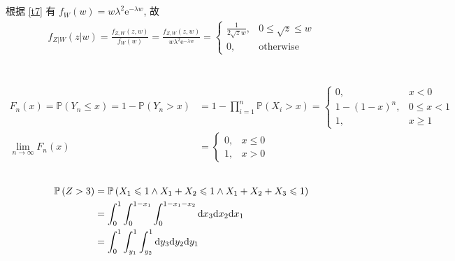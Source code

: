 \documentclass[8pt]{article}
\theoremstyle{compact}
\def\le{\leqslant}
\def\ge{\geqslant}
\def\P#1{\mathbb{P}\left({#1}\right)}
\def\e{\mathrm{e}}
\begin{document}
\subsection{}
根据 \cref{t7} 有 $f_W(w) = w\lambda^2\e^{-\lambda w}$, 故
\begin{equation}
	\begin{split}
		f_{Z | W}(z | w) = \frac{f_{Z, W}(z, w)}{f_W(w)} = \frac{f_{Z, W}(z, w)}{w\lambda^2\e^{-\lambda w}} = \begin{cases}
			\frac{1}{2\sqrt z w}, & 0 \le \sqrt z \le w\\
			0, & \text{otherwise}
		\end{cases}
	\end{split}
\end{equation}

\section{}
\subsection{}
\begin{equation}
	\begin{split}
		F_n(x) = \P{Y_n \le x} = 1 - \P{Y_n > x} &= 1 - \prod_{i=1}^{n}\P{X_i > x} = \begin{cases}
			0, & x < 0\\
			1 - (1 - x)^n, & 0 \le x < 1\\
			1, & x \ge 1
		\end{cases}\\
		\lim_{n \to \infty}F_n(x) &= \begin{cases}
			0, & x \le 0 \\
			1, & x > 0
		\end{cases}
	\end{split}
\end{equation}
\subsection{}
\begin{equation}
	\begin{split}
		\P{Z > 3} &= \P{X_1 \le 1 \wedge X_1 + X_2 \le 1 \wedge X_1 + X_2 + X_3 \le 1}\\
		&= \int_{0}^{1}\int_{0}^{1 - x_1}\int_{0}^{1 - x_1 - x_2}\text dx_3 \text dx_2 \text dx_1\\
		&= \int_{0}^{1}\int_{y_1}^{1}\int_{y_2}^{1}\text dy_3 \text dy_2 \text dy_1
	\end{split}
\end{equation}
\end{document}
